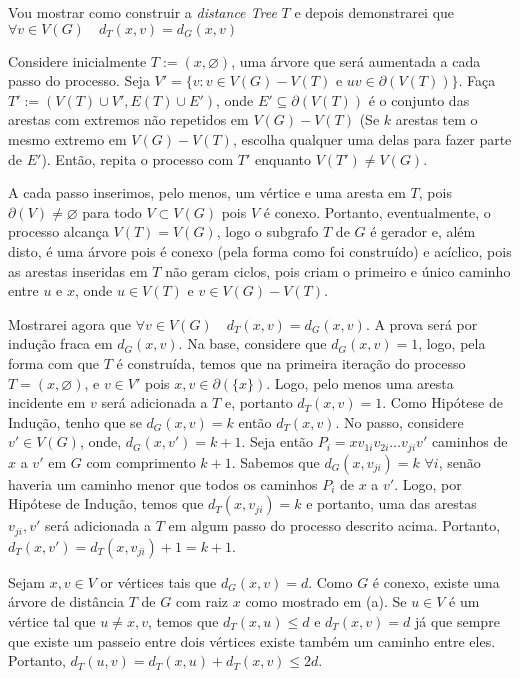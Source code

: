 Vou mostrar como construir a {\it distance Tree} $T$ e depois demonstrarei que $\forall v \in V(G)\quad d_T(x,v) = d_G(x,v)$

Considere inicialmente $T:=({x},\varnothing)$, uma árvore que será aumentada a cada passo do processo. Seja  $V' = \{v: v \in V(G) - V(T)$ e $uv \in \partial(V(T))\}$.
%
Faça $T' := (V(T)\cup V', E(T)\cup E')$,  onde $E' \subseteq \partial(V(T))$ é o conjunto das arestas com extremos não repetidos em $V(G) - V(T)$ (Se $k$ arestas tem o mesmo extremo em $V(G) - V(T)$, escolha qualquer uma delas para fazer parte de $E'$).
%
Então, repita o processo com $T'$ enquanto $V(T') \ne V(G)$.

A cada passo inserimos, pelo menos, um vértice e uma aresta em $T$, pois $\partial(V) \ne \varnothing$ para todo $V \subset V(G)$ pois $V$ é conexo.
%
Portanto, eventualmente, o processo alcança $V(T) = V(G)$, logo o subgrafo $T$ de $G$ é gerador e, além disto, é uma árvore pois é conexo (pela forma como foi construído) e acíclico, pois as arestas inseridas em $T$ não geram ciclos, pois criam o primeiro e único caminho entre $u$ e $x$, onde $u \in V(T)$ e $v \in V(G)-V(T)$.

Mostrarei agora que $\forall v \in V(G)\quad d_T(x,v) = d_G(x,v)$. A prova será por indução fraca em $d_G(x,v)$.
%
Na base, considere que $d_G(x,v) = 1$, logo, pela forma com que $T$ é construída, temos que na primeira iteração do processo $T=({x},\varnothing)$, e $v\in V'$ pois ${x,v} \in \partial(\{x\})$.
%
Logo, pelo menos uma aresta incidente em $v$ será adicionada a $T$ e, portanto $d_T(x,v) = 1$.
%
Como Hipótese de Indução, tenho que se $d_G(x,v) = k$ então $d_T(x,v)$.
%
No passo, considere $v' \in V(G)$, onde, $d_G(x,v') = k + 1$.
%
Seja então $P_i = xv_{1i}v_{2i}\ldots v_{ji}v'$ caminhos de $x$ a $v'$ em $G$ com comprimento $k + 1$. 
%
Sabemos que $d_G(x,v_{ji}) = k$ $\forall i$, senão haveria um caminho menor que todos os caminhos $P_i$ de $x$ a $v'$.
%
Logo, por Hipótese de Indução, temos que $d_T(x,v_{ji}) = k$ e portanto, uma das arestas ${v_{ji},v'}$ será adicionada a $T$ em algum passo do processo descrito acima.
%
Portanto, $d_T(x,v') = d_T(x,v_{ji}) + 1 = k + 1$.
\fimprova

Sejam $x,v \in V$ or vértices tais que $d_G(x,v) = d$. Como $G$ é conexo, existe
uma árvore de distância $T$ de $G$ com raiz $x$ como mostrado em (a). Se $u \in V$
é um vértice tal que $u \ne x,v$, temos que $d_T(x,u) \le d$ e $d_T(x,v) = d$ já
que sempre que existe um passeio entre dois vértices existe também um caminho
entre eles. Portanto, $d_T(u,v) = d_T(x,u) + d_T(x,v) \le 2d$.

